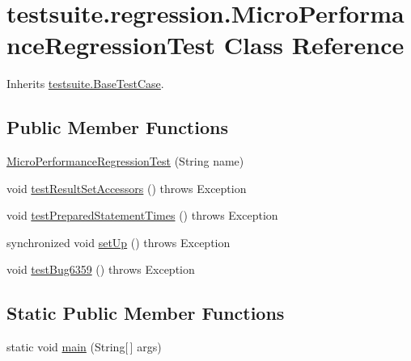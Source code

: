 \hypertarget{classtestsuite_1_1regression_1_1_micro_performance_regression_test}{}\section{testsuite.\+regression.\+Micro\+Performance\+Regression\+Test Class Reference}
\label{classtestsuite_1_1regression_1_1_micro_performance_regression_test}


Inherits \mbox{\hyperlink{classtestsuite_1_1_base_test_case}{testsuite.\+Base\+Test\+Case}}.

\subsection*{Public Member Functions}
\begin{DoxyCompactItemize}
\item 
\mbox{\hyperlink{classtestsuite_1_1regression_1_1_micro_performance_regression_test_a2b35cb55f972980421a850026caf1982}{Micro\+Performance\+Regression\+Test}} (String name)
\item 
void \mbox{\hyperlink{classtestsuite_1_1regression_1_1_micro_performance_regression_test_a1fa02a07cb865e21f5debd2b6cf58782}{test\+Result\+Set\+Accessors}} ()  throws Exception 
\item 
void \mbox{\hyperlink{classtestsuite_1_1regression_1_1_micro_performance_regression_test_a075ad2c74ac9703c0b94555dcf77cfb7}{test\+Prepared\+Statement\+Times}} ()  throws Exception 
\item 
synchronized void \mbox{\hyperlink{classtestsuite_1_1regression_1_1_micro_performance_regression_test_a020f1b11692f8a0a7e260e6f2b9978c0}{set\+Up}} ()  throws Exception 
\item 
void \mbox{\hyperlink{classtestsuite_1_1regression_1_1_micro_performance_regression_test_ae9d82e480f78e01505f493317298cd14}{test\+Bug6359}} ()  throws Exception 
\end{DoxyCompactItemize}
\subsection*{Static Public Member Functions}
\begin{DoxyCompactItemize}
\item 
static void \mbox{\hyperlink{classtestsuite_1_1regression_1_1_micro_performance_regression_test_add1a6e74f7b15be05664993e779b93c4}{main}} (String\mbox{[}$\,$\mbox{]} args)
\end{DoxyCompactItemize}
